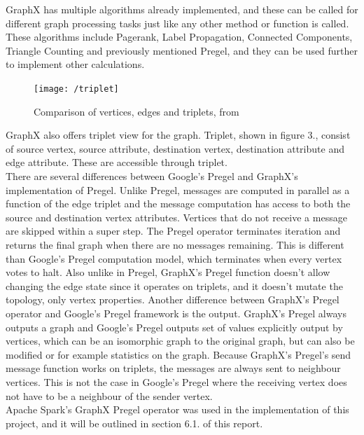 \documentclass{article}
\theoremstyle{definition}
\begin{document}
GraphX has multiple algorithms already implemented, and these can be called for different graph processing tasks just like any other method or function is called. These algorithms include Pagerank, Label Propagation, Connected Components, Triangle Counting and previously mentioned Pregel, and they can be used further to implement other calculations. \\

\begin{figure}[H]
\centering
\texttt{[image: /triplet]}
\caption{Comparison of vertices, edges and triplets, from \cite{GraphX} }
\end{figure}

GraphX also offers triplet view for the graph. Triplet, shown in figure 3., consist of source vertex, source attribute, destination vertex, destination attribute and edge attribute. These are accessible through triplet. \\

There are several differences between Google's Pregel and GraphX's implementation of Pregel. Unlike Pregel, messages are computed in parallel as a function of the edge triplet and the message computation has access to both the source and destination vertex attributes. Vertices that do not receive a message are skipped within a super step. The Pregel operator terminates iteration and returns the final graph when there are no messages remaining. This is different than Google's Pregel computation model, which terminates when every vertex votes to halt. Also unlike in Pregel, GraphX's Pregel function doesn't allow changing the edge state since it operates on triplets, and it doesn't mutate the topology, only vertex properties. Another difference between GraphX's Pregel operator and Google's Pregel framework is the output. GraphX's Pregel always outputs a graph and Google's Pregel outputs set of values explicitly output by vertices, which can be an isomorphic graph to the original graph, but can also be modified or for example statistics on the graph. Because GraphX's Pregel's send message function works on triplets, the messages are always sent to neighbour vertices. This is not the case in Google's Pregel where the receiving vertex does not have to be a neighbour of the sender vertex. \\

Apache Spark's GraphX Pregel operator was used in the implementation of this project, and it will be outlined in section 6.1. of this report. \\
\end{document}
